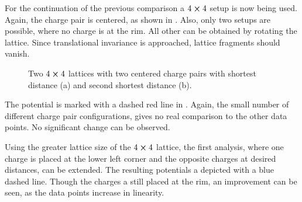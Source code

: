 For the continuation of the previous comparison a $4\cross4$ setup is now being used. Again, the charge pair is centered, as shown in . Also, only two setups are possible, where no charge is at the rim. All other can be obtained by rotating the lattice.
Since translational invariance is approached, lattice fragments should vanish.
\begin{figure}[h]
	\begin{center}
		\subfloat[]{
			\scalebox{0.7}{
				
			}
		}
		\subfloat[]{
			\scalebox{0.7}{
				
			}
		}
		\caption{Two $4\cross 4$ lattices with two centered charge pairs with shortest distance (a) and second shortest distance (b).}\label{fig:4x4v1}
	\end{center}
\end{figure}
The potential is marked with a dashed red line in . Again, the small number of different charge pair configurations, gives no real comparison to the other data points. No significant change can be observed. 

Using the greater lattice size of the $4\cross4$ lattice, the first analysis, where one charge is placed at the lower left corner and the opposite charges at desired distances, can be extended. The resulting potentials a depicted with a blue dashed line. Though the charges a still placed at the rim, an improvement can be seen, as the data points increase in linearity. 

